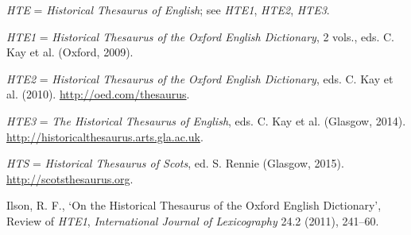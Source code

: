 \begin{list}{}



\item %
\textit{HTE} = \textit{Historical Thesaurus of English}; see \textit{HTE1}, \textit{HTE2}, \textit{HTE3}.

\item %
\textit{HTE1} = \textit{Historical Thesaurus of the Oxford English Dictionary}, 2 vols., eds. C. Kay et al. (Oxford, 2009).

\item %
\textit{HTE2} = \textit{Historical Thesaurus of the Oxford English Dictionary}, eds. C. Kay et al. (2010). \url{http://oed.com/thesaurus}.

\item %
\textit{HTE3} = \textit{The Historical Thesaurus of English}, eds. C. Kay et al. (Glasgow, 2014). \url{http://historicalthesaurus.arts.gla.ac.uk}.

\item %
\textit{HTS} = \textit{Historical Thesaurus of Scots}, ed. S. Rennie (Glasgow, 2015). \url{http://scotsthesaurus.org}.




\item %
Ilson, R. F., `On the Historical Thesaurus of the Oxford English Dictionary', Review of \textit{HTE1}, \textit{International Journal of Lexicography} 24.2 (2011), 241–60.


\end{list}

